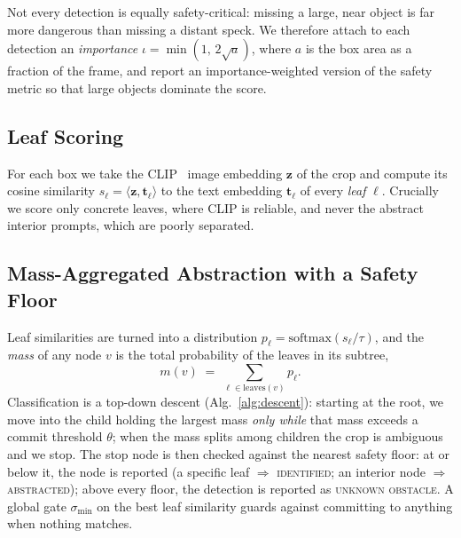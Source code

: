 \documentclass[conference]{IEEEtran}
\begin{document}
Not every detection is equally safety-critical: missing a large, near object is
far more dangerous than missing a distant speck. We therefore attach to each
detection an \emph{importance} $\iota = \min(1,\,2\sqrt{a})$, where $a$ is the
box area as a fraction of the frame, and report an importance-weighted version
of the safety metric so that large objects dominate the score.

\subsection{Leaf Scoring}
For each box we take the CLIP~\cite{radford2021} image embedding $\mathbf{z}$ of
the crop and compute its cosine similarity $s_\ell =
\langle\mathbf{z},\mathbf{t}_\ell\rangle$ to the text embedding
$\mathbf{t}_\ell$ of every \emph{leaf} $\ell$. Crucially we score only concrete
leaves, where CLIP is reliable, and never the abstract interior prompts, which
are poorly separated.

\subsection{Mass-Aggregated Abstraction with a Safety Floor}
Leaf similarities are turned into a distribution
$p_\ell = \mathrm{softmax}(s_\ell/\tau)$, and the \emph{mass} of any node $v$ is
the total probability of the leaves in its subtree,
\begin{equation}
m(v) \;=\; \sum_{\ell \in \mathrm{leaves}(v)} p_\ell .
\label{eq:mass}
\end{equation}
Classification is a top-down descent (Alg.~\ref{alg:descent}): starting at the
root, we move into the child holding the largest mass \emph{only while} that mass
exceeds a commit threshold $\theta$; when the mass splits among children the crop
is ambiguous and we stop. The stop node is then checked against the nearest
safety floor: at or below it, the node is reported (a specific leaf $\Rightarrow$
\textsc{identified}; an interior node $\Rightarrow$ \textsc{abstracted}); above
every floor, the detection is reported as \textsc{unknown obstacle}. A global
gate $\sigma_{\min}$ on the best leaf similarity guards against committing to
anything when nothing matches.
\end{document}
